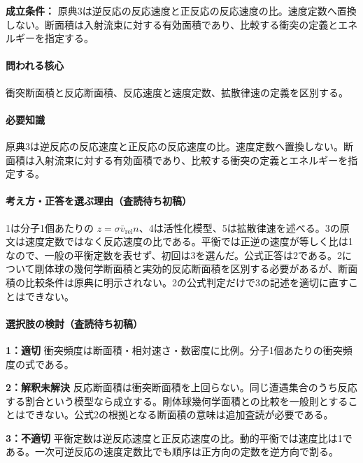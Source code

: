 \noindent\textbf{成立条件：} 原典3は逆反応の反応速度と正反応の反応速度の比。速度定数へ置換しない。断面積は入射流束に対する有効面積であり、比較する衝突の定義とエネルギーを指定する。\par

\paragraph{問われる核心} 衝突断面積と反応断面積、反応速度と速度定数、拡散律速の定義を区別する。

\paragraph{必要知識} 原典3は逆反応の反応速度と正反応の反応速度の比。速度定数へ置換しない。断面積は入射流束に対する有効面積であり、比較する衝突の定義とエネルギーを指定する。

\paragraph{考え方・正答を選ぶ理由（査読待ち初稿）} 1は分子1個あたりの \(z=\sigma\bar v_{\mathrm{rel}}n\)、4は活性化模型、5は拡散律速を述べる。3の原文は速度定数ではなく反応速度の比である。平衡では正逆の速度が等しく比は1なので、一般の平衡定数を表せず、初回は3を選んだ。公式正答は2である。2について剛体球の幾何学断面積と実効的反応断面積を区別する必要があるが、断面積の比較条件は原典に明示されない。2の公式判定だけで3の記述を適切に直すことはできない。

\paragraph{選択肢の検討（査読待ち初稿）}\mbox{}\par

\noindent\textbf{1：適切} 衝突頻度は断面積・相対速さ・数密度に比例。分子1個あたりの衝突頻度の式である。\par

\noindent\textbf{2：解釈未解決} 反応断面積は衝突断面積を上回らない。同じ遭遇集合のうち反応する割合という模型なら成立する。剛体球幾何学面積との比較を一般則とすることはできない。公式2の根拠となる断面積の意味は追加査読が必要である。\par

\noindent\textbf{3：不適切} 平衡定数は逆反応速度と正反応速度の比。動的平衡では速度比は1である。一次可逆反応の速度定数比でも順序は正方向の定数を逆方向で割る。\par

